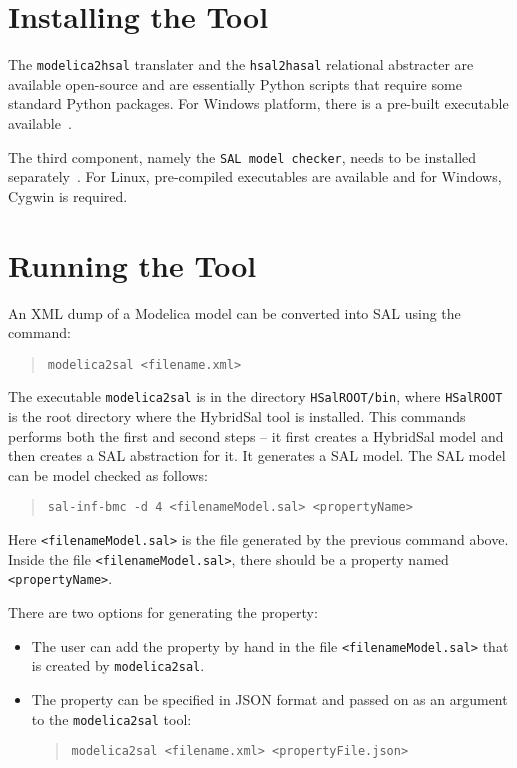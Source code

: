 \documentclass{article}
\begin{document}
\section{Installing the Tool}

The {\tt{modelica2hsal}} translater and the {\tt{hsal2hasal}} relational abstracter
are available open-source and are essentially Python scripts that require some
standard Python packages.  For Windows platform, there is a pre-built executable
available~\cite{hsalrelabs}. 

The third component, namely the {\tt{SAL model checker}}, needs to be installed
separately~\cite{SAL-language}.  For Linux, pre-compiled executables are available
and for Windows, Cygwin is required.

\section{Running the Tool}

An XML dump of a Modelica model can be converted into SAL using the command:
\begin{quote}
 {\tt{modelica2sal  <filename.xml>}}
\end{quote}
The executable {\tt{modelica2sal}} is in the directory
{\tt{HSalROOT/bin}}, where {\tt{HSalROOT}} is the root directory where
the HybridSal tool is installed.
This commands performs both the first and second steps -- it first creates a 
HybridSal model and then creates a SAL abstraction for it.
It generates a SAL model.  The SAL model can be model checked as follows:
\begin{quote}
 {\tt{sal-inf-bmc -d 4 <filenameModel.sal> <propertyName>}}
\end{quote}
Here {\tt{<filenameModel.sal>}} is the file generated by the previous command above.
Inside the file {\tt{<filenameModel.sal>}}, there should be a property named
{\tt{<propertyName>}}.

There are two options for generating the property:
\begin{itemize}
\item The user can add the property by hand in the file {\tt{<filenameModel.sal>}}
that is created by {\tt{modelica2sal}}.
\item The property can be specified in JSON format and passed on as an argument to
the {\tt{modelica2sal}} tool:
\begin{quote}
 {\tt{modelica2sal  <filename.xml> <propertyFile.json>}}
\end{quote}
\end{itemize}
\end{document}
